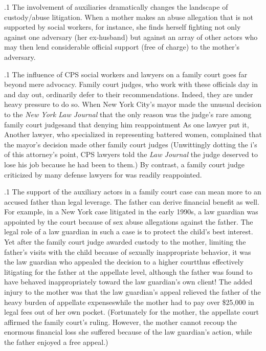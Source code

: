\documentclass[11pt, twoside]{article}
\begin{document}
{\p.1{%
The involvement of auxiliaries dramatically changes the landscape of
custody/abuse litigation. When a mother makes an abuse allegation that
is not supported by social workers, for instance, she finds herself fighting
not only against one adversary (her ex-husband) but against an array of
other actors who may then lend considerable official support (free of
charge) to the mother’s adversary.
}%

\p.1{%
The influence of CPS social workers and lawyers on a family court
goes far beyond mere advocacy. Family court judges, who work with
these officials day in and day out, ordinarily defer to their recommendations. Indeed, they are under heavy pressure to do so. When New York
City’s mayor made the unusual decision 
to the \textit{New York Law Journal} that the only reason was the judge’s
\mdash{}rare among family court
judges\mdash{}and that denying him reappointment 
As one lawyer put it,  Another lawyer, who specialized
in representing battered women, complained that the mayor’s decision
made other family court judges 
(Unwittingly dotting the i’s of this attorney’s point, CPS lawyers told
the \textit{Law Journal} the judge deserved to lose his job because he had been
 to them.) By contrast, a family court judge criticized by
many defense lawyers for  was readily reappointed.
}%

\p.1{%
The support of the auxiliary actors in a family court case can mean
more to an accused father than legal leverage. The father can derive financial benefit as well. For example, in a New York case litigated in the
early 1990s, a law guardian was appointed by the court because of sex
abuse allegations against the father. The legal role of a law guardian in
such a case is to protect the child’s best interest. Yet after the family court
judge awarded custody to the mother, limiting the father’s visits with the
child because of sexually inappropriate behavior, it was the law guardian
who appealed the decision to a higher court\mdash{}thus effectively litigating
for the father at the appellate level, although the father was found to
have behaved inappropriately toward the law guardian’s own client! The
added injury to the mother was that the law guardian’s appeal relieved
the father of the heavy burden of appellate expenses\mdash{}while the mother
had to pay over \$25,000 in legal fees out of her own pocket. (Fortunately
for the mother, the appellate court affirmed the family court’s ruling.
However, the mother cannot recoup the enormous financial loss she suffered because of the law guardian’s action, while the father enjoyed a free
appeal.)
}%

}
\end{document}
